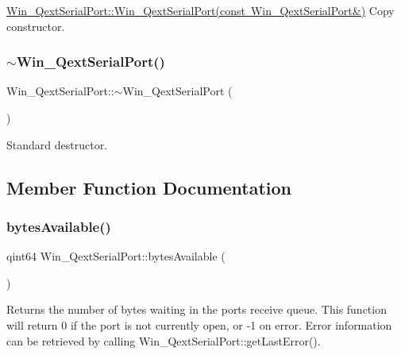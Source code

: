 \mbox{\hyperlink{class_win___qext_serial_port_aa2968038a33b91c0f21e43f2a267a35c}{Win\+\_\+\+Qext\+Serial\+Port\+::\+Win\+\_\+\+Qext\+Serial\+Port(const Win\+\_\+\+Qext\+Serial\+Port\&)}} Copy constructor. \mbox{\label{class_win___qext_serial_port_a6700be65cee973991ccf77a6afdf131a}} 
\subsubsection{\texorpdfstring{$\sim$\+Win\+\_\+\+Qext\+Serial\+Port()}{~Win\_QextSerialPort()}}
{\footnotesize\ttfamily Win\+\_\+\+Qext\+Serial\+Port\+::$\sim$\+Win\+\_\+\+Qext\+Serial\+Port (\begin{DoxyParamCaption}{ }\end{DoxyParamCaption})\hspace{0.3cm}{\ttfamily [virtual]}}

Standard destructor. 

\subsection{Member Function Documentation}
\mbox{\label{class_win___qext_serial_port_a8c76fa901fd01f97f57addad088c3e2c}} 
\subsubsection{\texorpdfstring{bytes\+Available()}{bytesAvailable()}}
{\footnotesize\ttfamily qint64 Win\+\_\+\+Qext\+Serial\+Port\+::bytes\+Available (\begin{DoxyParamCaption}{ }\end{DoxyParamCaption})\hspace{0.3cm}{\ttfamily [virtual]}}

Returns the number of bytes waiting in the port\textquotesingle{}s receive queue. This function will return 0 if the port is not currently open, or -\/1 on error. Error information can be retrieved by calling Win\+\_\+\+Qext\+Serial\+Port\+::get\+Last\+Error(). 

